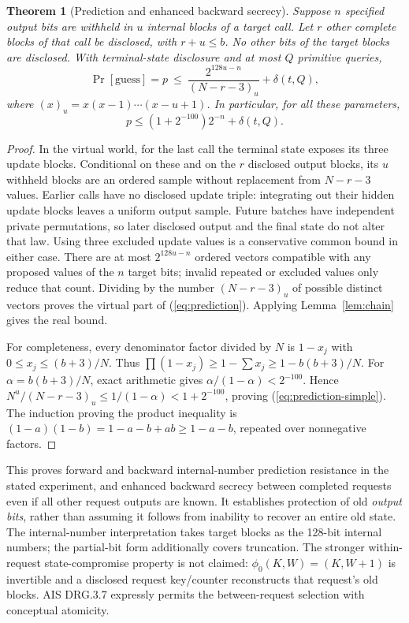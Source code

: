 \documentclass[11 pt,a 4 paper]{article}
\newtheorem{theorem}{Theorem}
\begin{document}
\begin{theorem}[Prediction and enhanced backward secrecy]\label{thm:predict}
Suppose $ n $ specified output bits are withheld in $ u $ internal blocks of a target call. Let $ r $ other complete blocks of that call be disclosed, with $ r+u\leq b $. No other bits of the target blocks are disclosed. With terminal-state disclosure and at most $ Q $ primitive queries,
\begin{equation}
 \Pr[\mathrm{guess}]=p\ \leq\
 \frac{2^{128 u-n}}{(N-r-3)_u}+\delta(t,Q),\label{eq:prediction}
\end{equation}
where $(x)_u=x(x-1)\cdots(x-u+1)$. In particular, for all these parameters,
\begin{equation}
 p\leq (1+2^{-100})2^{-n}+\delta(t,Q).\label{eq:prediction-simple}
\end{equation}
\end{theorem}
\begin{proof}
In the virtual world, for the last call the terminal state exposes its three update blocks. Conditional on these and on the $ r $ disclosed output blocks, its $ u $ withheld blocks are an ordered sample without replacement from $ N-r-3$ values. Earlier calls have no disclosed update triple: integrating out their hidden update blocks leaves a uniform output sample. Future batches have independent private permutations, so later disclosed output and the final state do not alter that law. Using three excluded update values is a conservative common bound in either case. There are at most $2^{128 u-n}$ ordered vectors compatible with any proposed values of the $ n $ target bits; invalid repeated or excluded values only reduce that count. Dividing by the number $(N-r-3)_u $ of possible distinct vectors proves the virtual part of (\ref{eq:prediction}). Applying Lemma~\ref{lem:chain} gives the real bound.

For completeness, every denominator factor divided by $ N $ is $1-x_j $ with $0\leq x_j\leq(b+3)/N $. Thus $\prod(1-x_j)\geq 1-\sum x_j\geq 1-b(b+3)/N $. For $\alpha=b(b+3)/N $, exact arithmetic gives $\alpha/(1-\alpha)<2^{-100}$. Hence $ N^u/(N-r-3)_u\leq 1/(1-\alpha)<1+2^{-100}$, proving (\ref{eq:prediction-simple}). The induction proving the product inequality is $(1-a)(1-b)=1-a-b+ab\geq 1-a-b $, repeated over nonnegative factors.
\end{proof}

This proves forward and backward internal-number prediction resistance in the stated experiment, and enhanced backward secrecy between completed requests even if all other request outputs are known. It establishes protection of old \emph{output bits}, rather than assuming it follows from inability to recover an entire old state. The internal-number interpretation takes target blocks as the 128-bit internal numbers; the partial-bit form additionally covers truncation. The stronger within-request state-compromise property is not claimed: $\phi_0(K,W)=(K,W+1)$ is invertible and a disclosed request key/counter reconstructs that request's old blocks. AIS DRG.3.7 expressly permits the between-request selection with conceptual atomicity.
\end{document}
